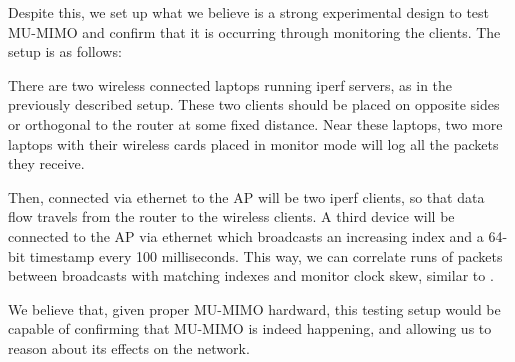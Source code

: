 Despite this, we set up what we believe is a strong experimental design to test
MU-MIMO and confirm that it is occurring through monitoring the clients. The
setup is as follows:

There are two wireless connected laptops running iperf servers, as in the
previously described setup. These two clients should be placed on opposite sides
or orthogonal to the router at some fixed distance. Near these laptops, two more
laptops with their wireless cards placed in monitor mode will log all the
packets they receive.

Then, connected via ethernet to the AP will be two iperf clients, so that data
flow travels from the router to the wireless clients. A third device will be
connected to the AP via ethernet which broadcasts an increasing index and a
64-bit timestamp every 100 milliseconds. This way, we can correlate runs of
packets between broadcasts with matching indexes and monitor clock skew, similar
to .

We believe that, given proper MU-MIMO hardward, this testing setup would be
capable of confirming that MU-MIMO is indeed happening, and allowing us to
reason about its effects on the network.
